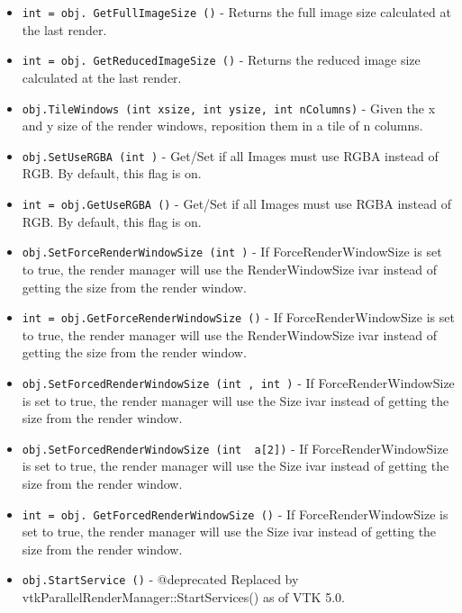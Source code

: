 \begin{itemize}
\item  \verb|int = obj. GetFullImageSize ()| -  Returns the full image size calculated at the last render.

\item  \verb|int = obj. GetReducedImageSize ()| -  Returns the reduced image size calculated at the last render.

\item  \verb|obj.TileWindows (int xsize, int ysize, int nColumns)| -  Given the x and y size of the render windows, reposition them
 in a tile of n columns.

\item  \verb|obj.SetUseRGBA (int )| -  Get/Set if all Images must use RGBA instead of RGB. By default,
 this flag is on.

\item  \verb|int = obj.GetUseRGBA ()| -  Get/Set if all Images must use RGBA instead of RGB. By default,
 this flag is on.

\item  \verb|obj.SetForceRenderWindowSize (int )| -  If ForceRenderWindowSize is set to true, the render manager will use
 the RenderWindowSize ivar instead of getting the size from the render window.

\item  \verb|int = obj.GetForceRenderWindowSize ()| -  If ForceRenderWindowSize is set to true, the render manager will use
 the RenderWindowSize ivar instead of getting the size from the render window.

\item  \verb|obj.SetForcedRenderWindowSize (int , int )| -  If ForceRenderWindowSize is set to true, the render manager will use
 the Size ivar instead of getting the size from the render window.

\item  \verb|obj.SetForcedRenderWindowSize (int  a[2])| -  If ForceRenderWindowSize is set to true, the render manager will use
 the Size ivar instead of getting the size from the render window.

\item  \verb|int = obj. GetForcedRenderWindowSize ()| -  If ForceRenderWindowSize is set to true, the render manager will use
 the Size ivar instead of getting the size from the render window.

\item  \verb|obj.StartService ()| -  @deprecated Replaced by vtkParallelRenderManager::StartServices()
 as of VTK 5.0.


\end{itemize}
